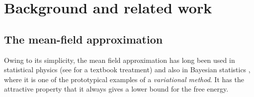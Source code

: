 \documentclass[11pt, oneside, english]{article}
\theoremstyle{definition}
\theoremstyle{plain}
\begin{document}


\section{Background and related work}
\subsection{The mean-field approximation}
Owing to its simplicity, the mean field approximation %
has long been used in statistical physics (see \cite{parisi1988statistical} for a textbook treatment) and also in Bayesian statistics \cite{peterson-anderson,jordan1999introduction,wainwright-jordan-variational}, where it is one of the prototypical examples of a \emph{variational method}. It has the attractive property that it always gives a lower bound for the free energy. 
\end{document}
